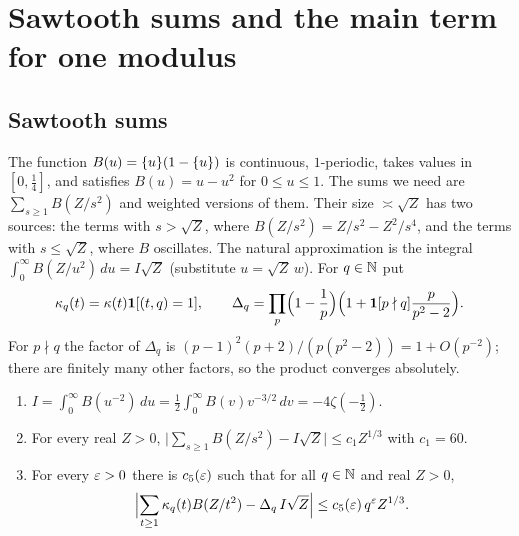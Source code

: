 \section{Sawtooth sums and the main term for one modulus}\label{sec:sawtooth}

\subsection{Sawtooth sums}

The function $B(u)=\{u\}(1-\{u\})$ is continuous, $1$-periodic, takes values in $[0,\frac14]$, and satisfies $B(u)=u-u^2$ for $0\le u\le1$. The sums we need are $\sum_{s\ge1}B(Z/s^2)$ and weighted versions of them. Their size $\asymp\sqrt Z$ has two sources: the terms with $s>\sqrt Z$, where $B(Z/s^2)=Z/s^2-Z^2/s^4$, and the terms with $s\le\sqrt Z$, where $B$ oscillates. The natural approximation is the integral $\int_0^\infty B(Z/u^2)\,du=I\sqrt Z$ (substitute $u=\sqrt Z\,w$). For $q\in\mathbb{N}$ put
\[
\kappa_q(t)=\kappa(t)\mathbf{1}[(t,q)=1],\qquad \Delta_q=\prod_p\Bigl(1-\frac1p\Bigr)\Bigl(1+\mathbf{1}[p\nmid q]\frac{p}{p^2-2}\Bigr).
\]
For $p\nmid q$ the factor of $\Delta_q$ is $(p-1)^2(p+2)/(p(p^2-2))=1+O(p^{-2})$; there are finitely many other factors, so the product converges absolutely.

\begin{proposition}\label{prop:sawtooth}
\leavevmode
\begin{enumerate}[label=\textup{(\alph*)}]
\item $I=\int_0^\infty B(u^{-2})\,du=\frac12\int_0^\infty B(v)v^{-3/2}\,dv=-4\zeta(-\tfrac12)$.
\item For every real $Z>0$, $\bigl|\sum_{s\ge1}B(Z/s^2)-I\sqrt Z\bigr|\le c_1Z^{1/3}$ with $c_1=60$.
\item For every $\varepsilon>0$ there is $c_5(\varepsilon)$ such that for all $q\in\mathbb{N}$ and real $Z>0$,
\[
\Bigl|\sum_{t\ge1}\kappa_q(t)B(Z/t^2)-\Delta_q\,I\sqrt Z\Bigr|\le c_5(\varepsilon)\,q^\varepsilon Z^{1/3}.
\]
\end{enumerate}
\end{proposition}

